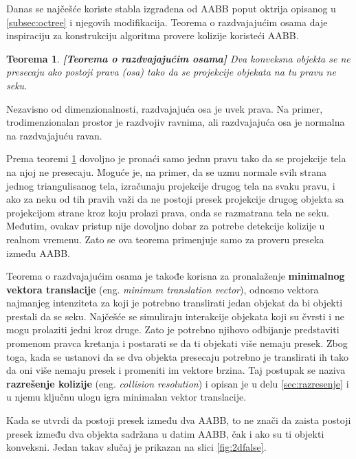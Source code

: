 \documentclass[12pt,oneside]{memoir}
\newtheorem{teo}{Teorema}[section]
\begin{document}
Danas se najčešće koriste stabla izgrađena od AABB poput oktrija opisanog u \ref{subsec:octree} i njegovih modifikacija. 
Teorema o razdvajajućim osama daje inspiraciju za konstrukciju algoritma provere kolizije koristeći AABB.

\begin{teo}
	\textbf{[Teorema o razdvajajućim osama]}
	\label{teo:sat}
	Dva konveksna objekta se ne presecaju ako postoji prava (osa) 
	tako da se projekcije objekata na tu pravu ne seku.
\end{teo}

Nezavisno od dimenzionalnosti, razdvajajuća osa je uvek prava. Na primer, trodimenzionalan prostor
je razdvojiv ravnima, ali razdvajajuća osa je normalna na razdvajajuću ravan.

Prema teoremi \ref{teo:sat} dovoljno je pronaći samo jednu pravu tako da se projekcije tela na njoj ne presecaju.
Moguće je, na primer, da se uzmu normale svih strana jednog triangulisanog tela, izračunaju projekcije drugog 
tela na svaku pravu, i ako za neku od tih pravih važi da ne postoji presek projekcije drugog objekta sa projekcijom strane kroz koju prolazi prava, onda se razmatrana tela ne seku.
Međutim, ovakav pristup nije dovoljno dobar za potrebe detekcije kolizije u realnom vremenu. 
Zato se  ova teorema primenjuje samo za proveru preseka između AABB.

Teorema o razdvajajućim osama je takođe korisna za pronalaženje \textbf{minimalnog vektora translacije} (eng. {\em minimum translation vector}), odnosno
vektora najmanjeg intenziteta za koji je potrebno translirati jedan objekat da bi objekti prestali da se seku.
Najčešće se simuliraju interakcije objekata koji su čvrsti i ne mogu prolaziti jedni kroz druge.
Zato je potrebno njihovo odbijanje predstaviti promenom pravca kretanja i postarati se da ti objekati više nemaju presek.
Zbog toga, kada se ustanovi da se dva objekta presecaju potrebno je translirati ih tako da oni više nemaju presek i promeniti im vektore brzina.
Taj postupak se naziva \textbf{razrešenje kolizije} (eng. {\em collision resolution}) i opisan je u delu \ref{sec:razresenje} i u njemu ključnu ulogu igra minimalan vektor translacije.

Kada se utvrdi da postoji presek između dva AABB, to ne znači da zaista postoji presek između dva objekta
sadržana u datim AABB, čak i ako su ti objekti konveksni. Jedan takav slučaj je prikazan na slici \ref{fig:2dfalse}. 
\end{document}
